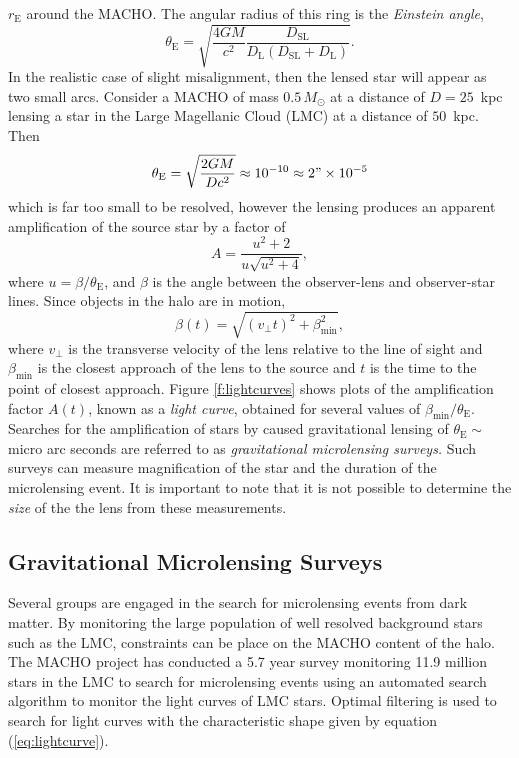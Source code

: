 $r_\mathrm{E}$ around the MACHO. The angular radius of this ring is the
\emph{Einstein angle},
\begin{equation}
\theta_\mathrm{E} = \sqrt{\frac{4GM}{c^2} \frac{D_\mathrm{SL}}
{D_\mathrm{L}\left(D_\mathrm{SL} + D_\mathrm{L}\right)}}.
\end{equation}
In the realistic case of slight misalignment, then the lensed star will appear
as two small arcs. Consider a MACHO of mass $0.5\,M_\odot$ at a distance of $D
= 25$~kpc lensing a star in the Large Magellanic Cloud (LMC) at a distance of
$50$~kpc. Then
\begin{equation}
\theta_\mathrm{E} = \sqrt{\frac{2GM}{Dc^2}} \approx 10^{-10} \approx 2" \times
10^{-5}
\end{equation}
which is far too small to be resolved, however the lensing produces an
apparent amplification of the source star by a factor
of\cite{1964MNRAS.128..295R}
\begin{equation}
A = \frac{u^2 + 2}{u\sqrt{u^2 + 4}},
\label{eq:lightcurve}
\end{equation}
where $u = \beta / \theta_\mathrm{E}$, and $\beta$ is the angle between the
observer-lens and observer-star lines. Since objects in the halo are in
motion,
\begin{equation}
\beta(t) = \sqrt{ (v_\perp t)^2 + \beta_\mathrm{min}^2 },
\end{equation}
where $v_\perp$ is the transverse velocity of the lens relative to the 
line of sight and $\beta_\mathrm{min}$ is the closest approach of the lens to
the source and $t$ is the time to the point of closest
approach\cite{Paczynski:1985jf,Griest:1990vu}. Figure \ref{f:lightcurves}
shows plots of the amplification factor $A(t)$, known as a \emph{light curve},
obtained for several values of $\beta_\mathrm{min} / \theta_\mathrm{E}$.
Searches for the amplification of stars by caused gravitational lensing of
$\theta_\mathrm{E} \sim $ micro arc seconds are referred to as
\emph{gravitational microlensing surveys.} Such surveys can measure
magnification of the star and the duration of the microlensing event. It is
important to note that it is not possible to determine the \emph{size} of the
the lens from these measurements.

\subsection{Gravitational Microlensing Surveys}

Several groups are engaged in the search for microlensing events from dark
matter\cite{Alcock:2000ph,Afonso:2002xq}. By monitoring the large population of
well resolved background stars such as the LMC, constraints can be place on the
MACHO content of the halo. The MACHO project has conducted a 5.7 year survey
monitoring 11.9 million stars in the LMC to search for microlensing
events\cite{Alcock:2000ph} using an automated search algorithm to monitor the
light curves of LMC stars. Optimal filtering is used to search for light curves
with the characteristic shape given by equation (\ref{eq:lightcurve}).


